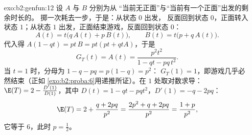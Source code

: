 \begin{solution}{exo:b2:genfun:12}
设 $A$ 与 $B$ 分别为从
“当前无正面”与“当前有一个正面”出发的剩余时长的。
掷一次耗去一步，于是：从状态 $0$ 出发，
反面回到状态 $0$，正面转入状态 $1$；从状态
$1$ 出发，正面结束游戏，反面回到状态 $0$：
\[
A(t) = t\bigl(q\,A(t) + p\,B(t)\bigr),
\qquad
B(t) = t\bigl(p + q\,A(t)\bigr).
\]
代入得 $A(1 - qt) = pt\,B = pt(pt + qtA)$，于是
\[
G_T(t) = A(t) = \frac{p^2t^2}{1 - qt - pq\,t^2} .
\]
当 $t = 1$ 时，分母为 $1 - q - pq = p(1 - q) = p^2$：
$G_T(1) = 1$，即游戏几乎必然结束（正如
\cref{exo:b2:proba:6}用递推所证）。在 $1$ 处取对数求导：
$\E(T) = 2 - \frac{D'(1)}{D(1)}$，其中
$D(t) = 1 - qt - pqt^2$，$D'(1) = -q - 2pq$：
\[
\E(T) = 2 + \frac{q + 2pq}{p^2} = \frac{2p^2 + q + 2pq}{p^2}
= \frac{1 + p}{p^2},
\]
它等于 $6$，此时 $p = \frac12$。
\end{solution}

